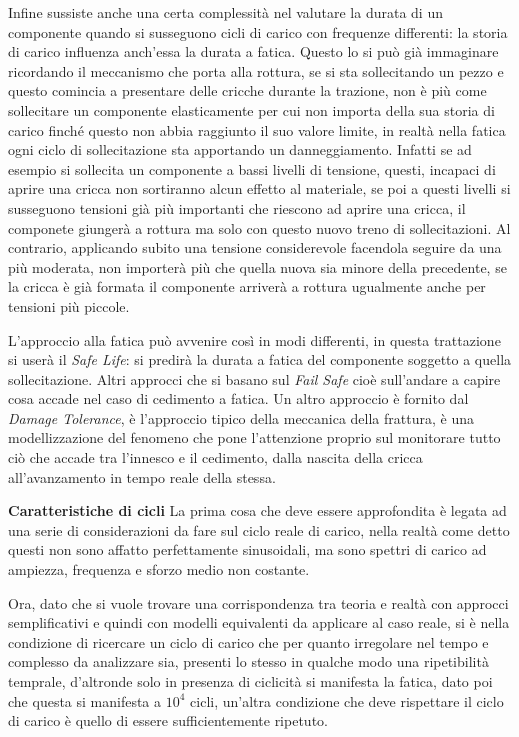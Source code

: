 \documentclass{article}
\begin{document}
\begin{adjustwidth}{2in}{}
		Infine sussiste anche una certa complessità nel valutare la durata di un componente quando si susseguono cicli di carico con frequenze differenti: la storia di carico influenza anch'essa la durata a fatica. Questo lo si può già immaginare ricordando il meccanismo che porta alla rottura, se si sta sollecitando un pezzo e questo comincia a presentare delle cricche durante la trazione, non è più come sollecitare un componente elasticamente per cui non importa della sua storia di carico finché questo non abbia raggiunto il suo valore limite, in realtà nella fatica ogni ciclo di sollecitazione sta apportando un danneggiamento. Infatti se ad esempio si sollecita un componente a bassi livelli di tensione, questi, incapaci di aprire una cricca non sortiranno alcun effetto al materiale, se poi a questi livelli si susseguono tensioni già più importanti che riescono ad aprire una cricca, il componete giungerà a rottura ma solo con questo nuovo treno di sollecitazioni. Al contrario, applicando subito una tensione considerevole facendola seguire da una più moderata, non importerà più che quella nuova sia minore della precedente, se la cricca è già formata il componente arriverà a rottura ugualmente anche per tensioni più piccole. \newline
		 
		L'approccio alla fatica può avvenire così in modi differenti, in questa trattazione si userà il \textit{Safe Life}: si predirà la durata a fatica del componente soggetto a quella sollecitazione. Altri approcci che si basano sul \textit{Fail Safe} cioè sull'andare a capire cosa accade nel caso di cedimento a fatica. Un altro approccio è fornito dal \textit{Damage Tolerance}, è l'approccio tipico della meccanica della frattura, è una modellizzazione del fenomeno che pone l'attenzione proprio sul monitorare tutto ciò che accade tra l'innesco e il cedimento, dalla nascita della cricca all'avanzamento in tempo reale della stessa. \newpage
		
		\textbf{\Large Caratteristiche di cicli} \newline		 
		La prima cosa che deve essere  approfondita è legata ad una serie di considerazioni da fare sul ciclo reale di carico, nella realtà come detto questi non sono affatto perfettamente sinusoidali, ma sono spettri di carico ad ampiezza, frequenza e sforzo medio non costante. 
		
		Ora, dato che si vuole trovare una corrispondenza tra teoria e realtà con approcci semplificativi e quindi con modelli equivalenti da applicare al caso reale, si è nella condizione di ricercare un ciclo di carico che per quanto irregolare nel tempo e complesso da analizzare sia, presenti lo stesso in qualche modo una ripetibilità temprale, d'altronde solo in presenza di ciclicità si manifesta la fatica, dato poi che questa si manifesta a $10^4$ cicli, un'altra condizione che deve rispettare il ciclo di carico è quello di essere sufficientemente ripetuto.
		

\end{adjustwidth}
\end{document}
